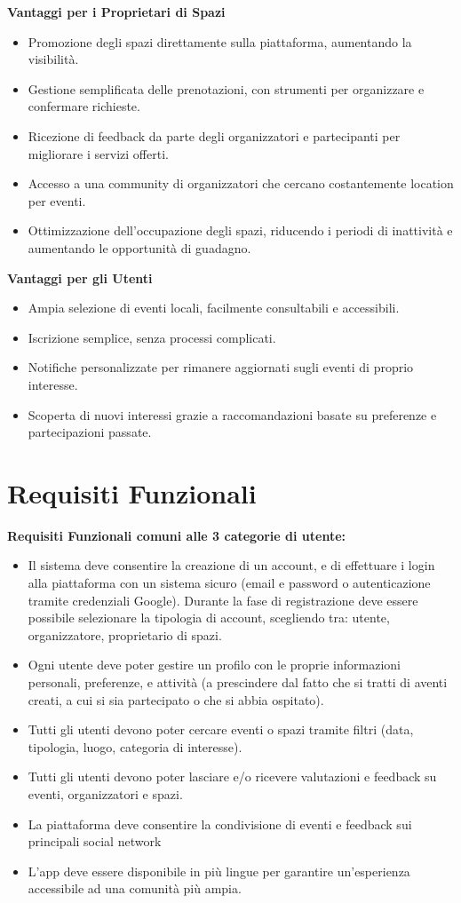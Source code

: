 \documentclass[9pt]{extarticle}
\begin{document}
\textbf{Vantaggi per i Proprietari di Spazi}
\begin{itemize}
	\item Promozione degli spazi direttamente sulla piattaforma, aumentando la visibilità.
	\item Gestione semplificata delle prenotazioni, con strumenti per organizzare e confermare richieste.
	\item Ricezione di feedback da parte degli organizzatori e partecipanti per migliorare i servizi offerti.
	\item Accesso a una community di organizzatori che cercano costantemente location per eventi.
	\item Ottimizzazione dell'occupazione degli spazi, riducendo i periodi di inattività e aumentando le opportunità di guadagno.
\end{itemize}

\textbf{Vantaggi per gli Utenti}
\begin{itemize}
	\item Ampia selezione di eventi locali, facilmente consultabili e accessibili.
	\item Iscrizione semplice, senza processi complicati.
	\item Notifiche personalizzate per rimanere aggiornati sugli eventi di proprio interesse.
	\item Scoperta di nuovi interessi grazie a raccomandazioni basate su preferenze e partecipazioni passate.
\end{itemize}

\section{Requisiti Funzionali}

\textbf{Requisiti Funzionali comuni alle 3 categorie di utente:}
\begin{itemize}
	\item \FR Il sistema deve consentire la creazione di un account, e di effettuare i login alla piattaforma con un sistema sicuro (email e password o autenticazione tramite credenziali Google). Durante la fase di registrazione deve essere possibile selezionare la tipologia di account, scegliendo tra: utente, organizzatore, proprietario di spazi.
	\item \FR Ogni utente deve poter gestire un profilo con le proprie informazioni personali, preferenze, e attività (a prescindere dal fatto che si tratti di aventi creati, a cui si sia partecipato o che si abbia ospitato).
	\item \FR Tutti gli utenti devono poter cercare eventi o spazi tramite filtri (data, tipologia, luogo, categoria di interesse).
	\item \FR Tutti gli utenti devono poter lasciare e/o ricevere valutazioni e feedback su eventi, organizzatori e spazi.
	\item \FR La piattaforma deve consentire la condivisione di eventi e feedback sui principali social network
	\item \FR L'app deve essere disponibile in più lingue per garantire un'esperienza accessibile ad una comunità più ampia.
\end{itemize}
\end{document}
